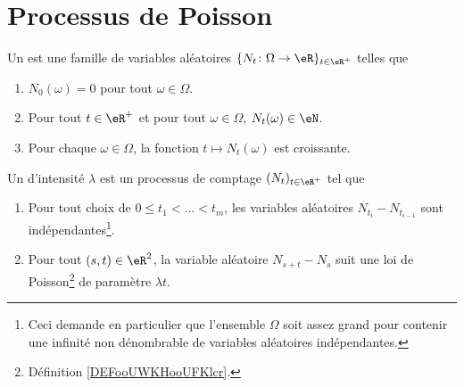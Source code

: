 
\section{Processus de Poisson}
\label{SecHxbtzQ}

\begin{definition}
	Un  est une famille de variables aléatoires \( \{ N_t\colon \Omega\to \eR \}_{t\in \eR^+}\) telles que
	\begin{enumerate}
		\item
		      \( N_0(\omega)=0\) pour tout \( \omega\in \Omega\).
		\item
		      Pour tout \( t\in \eR^+\) et pour tout \( \omega\in \Omega\), \( N_t(\omega)\in \eN\).
		\item
		      Pour chaque \( \omega\in \Omega\), la fonction \( t\mapsto N_t(\omega)\) est croissante.
	\end{enumerate}
\end{definition}

\begin{definition}        \label{DEFooWDXDooRGCtXL}
	Un  d'intensité \( \lambda\) est un processus de comptage \( (N_t)_{t\in \eR^+}\) tel que
	\begin{enumerate}
		\item
		      Pour tout choix de \( 0\leq t_1<\ldots < t_m\), les variables aléatoires \( N_{t_i}-N_{t_{i-1}}\) sont indépendantes\footnote{Ceci demande en particulier que l'ensemble \( \Omega\) soit assez grand pour contenir une infinité non dénombrable de variables aléatoires indépendantes.}.
		\item
		      Pour tout \( (s,t)\in \eR^2\), la variable aléatoire \( N_{s+t}-N_s\) suit une loi de Poisson\footnote{Définition \ref{DEFooUWKHooUFKlcr}.} de paramètre \( \lambda t\).
	\end{enumerate}
\end{definition}

